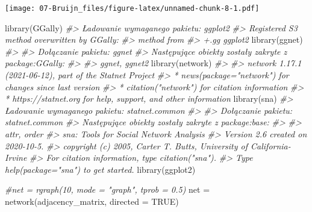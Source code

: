 \documentclass[
]{book}
\newenvironment{Shaded}{\begin{snugshade}}{\end{snugshade}}
\newcommand{\AttributeTok}[1]{\textcolor[rgb]{0.77,0.63,0.00}{#1}}
\newcommand{\CommentTok}[1]{\textcolor[rgb]{0.56,0.35,0.01}{\textit{#1}}}
\newcommand{\ConstantTok}[1]{\textcolor[rgb]{0.00,0.00,0.00}{#1}}
\newcommand{\FunctionTok}[1]{\textcolor[rgb]{0.00,0.00,0.00}{#1}}
\newcommand{\NormalTok}[1]{#1}
\newcommand{\OtherTok}[1]{\textcolor[rgb]{0.56,0.35,0.01}{#1}}
\begin{document}
\texttt{[image: 07-Bruijn\_files/figure-latex/unnamed-chunk-8-1.pdf]}

\begin{Shaded}
\begin{Highlighting}[]
\FunctionTok{library}\NormalTok{(GGally)}
\CommentTok{\#\textgreater{} Ładowanie wymaganego pakietu: ggplot2}
\CommentTok{\#\textgreater{} Registered S3 method overwritten by \textquotesingle{}GGally\textquotesingle{}:}
\CommentTok{\#\textgreater{}   method from   }
\CommentTok{\#\textgreater{}   +.gg   ggplot2}
\FunctionTok{library}\NormalTok{(ggnet)}
\CommentTok{\#\textgreater{} }
\CommentTok{\#\textgreater{} Dołączanie pakietu: \textquotesingle{}ggnet\textquotesingle{}}
\CommentTok{\#\textgreater{} Następujące obiekty zostały zakryte z \textquotesingle{}package:GGally\textquotesingle{}:}
\CommentTok{\#\textgreater{} }
\CommentTok{\#\textgreater{}     ggnet, ggnet2}
\FunctionTok{library}\NormalTok{(network)}
\CommentTok{\#\textgreater{} }
\CommentTok{\#\textgreater{} \textquotesingle{}network\textquotesingle{} 1.17.1 (2021{-}06{-}12), part of the Statnet Project}
\CommentTok{\#\textgreater{} * \textquotesingle{}news(package="network")\textquotesingle{} for changes since last version}
\CommentTok{\#\textgreater{} * \textquotesingle{}citation("network")\textquotesingle{} for citation information}
\CommentTok{\#\textgreater{} * \textquotesingle{}https://statnet.org\textquotesingle{} for help, support, and other information}
\FunctionTok{library}\NormalTok{(sna)}
\CommentTok{\#\textgreater{} Ładowanie wymaganego pakietu: statnet.common}
\CommentTok{\#\textgreater{} }
\CommentTok{\#\textgreater{} Dołączanie pakietu: \textquotesingle{}statnet.common\textquotesingle{}}
\CommentTok{\#\textgreater{} Następujące obiekty zostały zakryte z \textquotesingle{}package:base\textquotesingle{}:}
\CommentTok{\#\textgreater{} }
\CommentTok{\#\textgreater{}     attr, order}
\CommentTok{\#\textgreater{} sna: Tools for Social Network Analysis}
\CommentTok{\#\textgreater{} Version 2.6 created on 2020{-}10{-}5.}
\CommentTok{\#\textgreater{} copyright (c) 2005, Carter T. Butts, University of California{-}Irvine}
\CommentTok{\#\textgreater{}  For citation information, type citation("sna").}
\CommentTok{\#\textgreater{}  Type help(package="sna") to get started.}
\FunctionTok{library}\NormalTok{(ggplot2)}

\CommentTok{\#net = rgraph(10, mode = "graph", tprob = 0.5)}
\NormalTok{net }\OtherTok{=} \FunctionTok{network}\NormalTok{(adjacency\_matrix, }\AttributeTok{directed =} \ConstantTok{TRUE}\NormalTok{)}


\end{Highlighting}
\end{Shaded}
\end{document}
